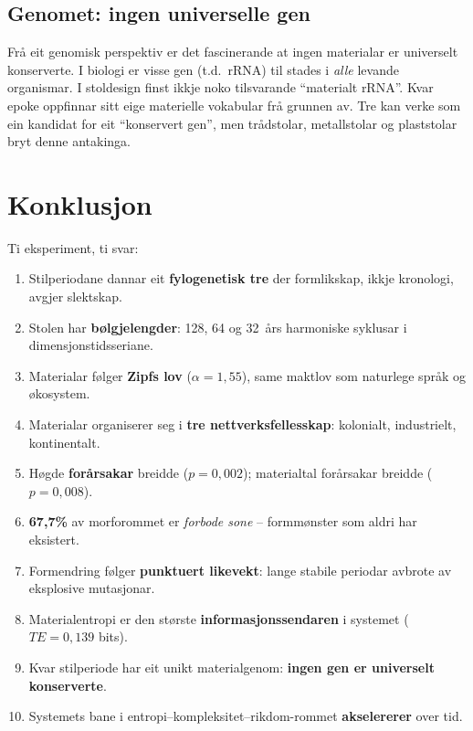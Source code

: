 \documentclass[10pt, a4paper, twocolumn]{article}
\begin{document}
\subsection{Genomet: ingen universelle gen}

Fr\aa{} eit genomisk perspektiv er det fascinerande at ingen materialar er universelt konserverte. I biologi er visse gen (t.d.\ rRNA) til stades i \emph{alle} levande organismar. I stoldesign finst ikkje noko tilsvarande ``materialt rRNA''. Kvar epoke oppfinnar sitt eige materielle vokabular fr\aa{} grunnen av. Tre kan verke som ein kandidat for eit ``konservert gen'', men tr\aa{}dstolar, metallstolar og plaststolar bryt denne antaking\-a.


\section{Konklusjon}

Ti eksperiment, ti svar:

\begin{enumerate}[leftmargin=*, topsep=3pt, itemsep=2pt]
  \item Stilperiodane dannar eit \textbf{fylogenetisk tre} der formlikskap, ikkje kronologi, avgjer slektskap.
  \item Stolen har \textbf{b\o{}lgjelengder}: 128, 64 og 32~\aa{}rs harmoniske syklusar i dimensjonstidsseriane.
  \item Materialar f\o{}lger \textbf{Zipfs lov} ($\alpha = 1{,}55$), same maktlov som naturlege spr\aa{}k og \o{}kosystem.
  \item Materialar organiserer seg i \textbf{tre nettverksfellesskap}: kolonialt, industrielt, kontinentalt.
  \item H\o{}gde \textbf{for\aa{}rsakar} breidde ($p = 0{,}002$); materialtal for\aa{}rsakar breidde ($p = 0{,}008$).
  \item \textbf{67{,}7\%} av morforommet er \emph{forbode sone} -- formm\o{}nster som aldri har eksistert.
  \item Formendring f\o{}lger \textbf{punktuert likevekt}: lange stabile periodar avbrote av eksplosive mutasjonar.
  \item Materialentropi er den st\o{}rste \textbf{informasjonssendaren} i systemet ($TE = 0{,}139$ bits).
  \item Kvar stilperiode har eit unikt materialgenom: \textbf{ingen gen er universelt konserverte}.
  \item Systemets bane i entropi--kompleksitet--rikdom-rommet \textbf{akselererer} over tid.
\end{enumerate}
\end{document}
